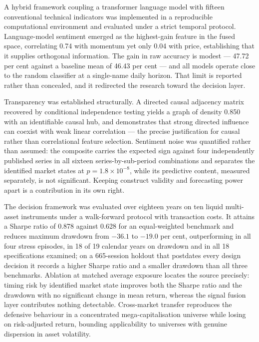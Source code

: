 A hybrid framework coupling a transformer language model with fifteen conventional
technical indicators was implemented in a reproducible computational environment and
evaluated under a strict temporal protocol. Language-model sentiment emerged as the
highest-gain feature in the fused space, correlating 0.74 with momentum yet only 0.04 with
price, establishing that it supplies orthogonal information. The gain in raw accuracy is
modest --- 47.72 per cent against a baseline mean of 46.43 per cent --- and all models
operate close to the random classifier at a single-name daily horizon. That limit is
reported rather than concealed, and it redirected the research toward the decision layer.

Transparency was established structurally. A directed causal adjacency matrix recovered by
conditional independence testing yields a graph of density 0.850 with an identifiable
causal hub, and demonstrates that strong directed influence can coexist with weak linear
correlation --- the precise justification for causal rather than correlational feature
selection. Sentiment noise was quantified rather than assumed: the composite carries the
expected sign against four independently published series in all sixteen
series-by-sub-period combinations and separates the identified market states at
$p = 1.8 \times 10^{-8}$, while its predictive content, measured separately, is not
significant. Keeping construct validity and forecasting power apart is a contribution in
its own right.

The decision framework was evaluated over eighteen years on ten liquid multi-asset
instruments under a walk-forward protocol with transaction costs. It attains a Sharpe
ratio of 0.878 against 0.628 for an equal-weighted benchmark and reduces maximum drawdown
from $-36.1$ to $-19.0$ per cent, outperforming in all four stress episodes, in 18 of 19
calendar years on drawdown and in all 18 specifications examined; on a 665-session holdout
that postdates every design decision it records a higher Sharpe ratio and a smaller
drawdown than all three benchmarks. Ablation at matched average exposure locates the
source precisely: timing risk by identified market state improves both the Sharpe ratio
and the drawdown with no significant change in mean return, whereas the signal fusion
layer contributes nothing detectable. Cross-market transfer reproduces the defensive
behaviour in a concentrated mega-capitalisation universe while losing on risk-adjusted
return, bounding applicability to universes with genuine dispersion in asset volatility.

